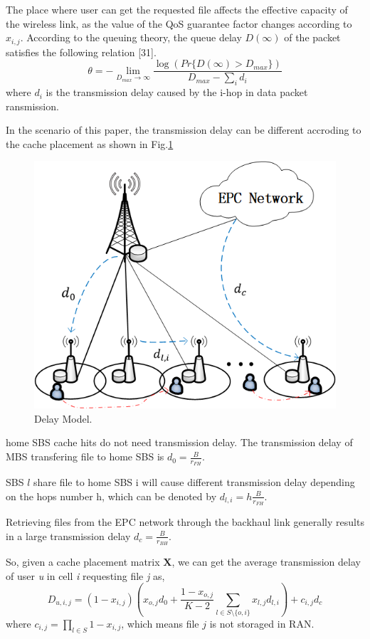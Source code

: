 \documentclass[conference]{IEEEtran}
\begin{document}
The place where user can get the requested file affects the effective capacity of the wireless link, as the value of the QoS guarantee factor changes according to $x_{i,j}$.
According to the queuing theory, the queue delay $D(\infty)$ of the packet satisfies the following relation [31].
\begin{equation}
\theta=-\lim_{D_{max}\to \infty}\frac{\log(Pr\{D(\infty)>D_{max}\})}{D_{max}-\sum_i d_i}
\end{equation}
where $d_i$ is the transmission delay caused by the i-hop in data packet ransmission.

In the scenario of this paper, the transmission delay can be different accroding to the cache placement as shown in Fig.\ref{fig 2}
\begin{figure}[htbp]
 \centerline{\includegraphics[scale=0.5]{fig2.png}}
 \caption{Delay Model.}
 \label{fig 2}
\end{figure}

home SBS cache hits do not need transmission delay. The transmission delay of MBS transfering file to home SBS is $d_0=\frac{B}{r_{FH}}$.

SBS $l$ share file to home SBS i will cause different transmission delay depending on the hops number h, which can be denoted by $d_{l,i}=h\frac{B}{r_{FH}}$.

Retrieving files from the EPC network through the backhaul link generally results in a large transmission delay $d_c=\frac{B}{r_{BH}}$.

So, given a cache placement matrix $\mathbf{X}$, we can get the average transmission delay of user \emph{u} in cell \emph{i} requesting file \emph{j} as,
\begin{equation}
D_{u,i,j}=(1-x_{i,j})(x_{o,j}d_0+\frac{1-x_{o,j}}{K-2}\sum_{l\in S\setminus{\{o,i\}}}x_{l,j}d_{l,i})+c_{i,j}d_c
\end{equation}
where $c_{i,j}= \prod_{l\in S}1-x_{i,j}$, which means file $j$ is not storaged in RAN.
\end{document}
